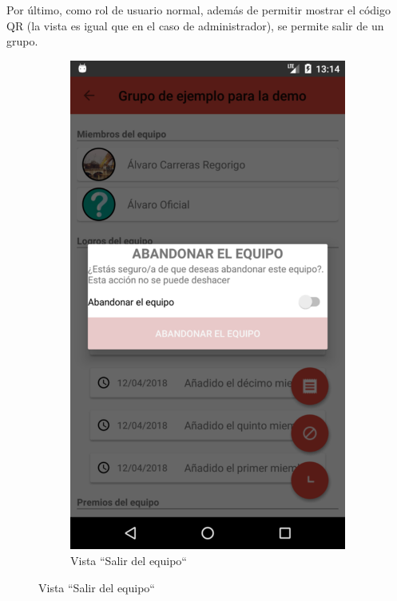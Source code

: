 \documentclass[twoside]{report}
\begin{document}
Por último, como rol de usuario normal, además de permitir mostrar el código QR (la vista es igual que en el caso de administrador), se permite salir de un grupo.
\begin{figure}[H]
\begin{center}
	\begin{subfigure}[t]{.3\linewidth}
		\includegraphics[scale=0.2]{images/userguide/21.png}
		\caption{Vista “Salir del equipo“}
	\end{subfigure}\hspace{5mm}%

\end{center}
\end{figure}
\end{document}

